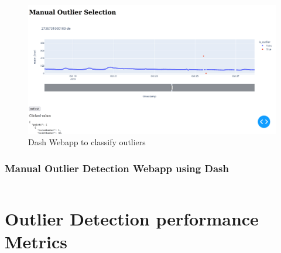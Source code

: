 \begin{figure}[H]
    \centering
    \includegraphics[width=\textwidth]{./pics/manual-outlier-selection.png}
    \caption{Dash Webapp to classify outliers}
    \label{figure:manual-outlier-selection}
\end{figure}


\subsubsection{Manual Outlier Detection Webapp using Dash}
\inputminted[linenos]{python}{./code/manual_outlier_detection.py}

\section{Outlier Detection performance Metrics}
